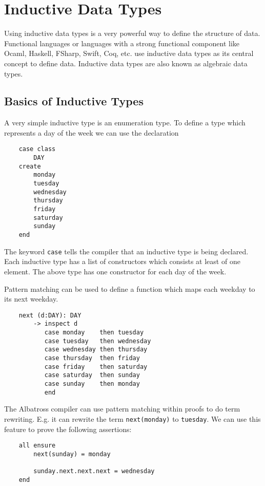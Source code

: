 \section{Inductive Data Types}

Using inductive data types is a very powerful way to define the structure of
data. Functional languages or languages with a strong functional component
like Ocaml, Haskell, FSharp, Swift, Coq, etc. use inductive data types as its
central concept to define data. Inductive data types are also known as
algebraic data types.


\subsection{Basics of Inductive Types}

A very simple inductive type is an enumeration type. To define a type which
represents a day of the week we can use the declaration

\begin{lstlisting}
    case class
        DAY
    create
        monday
        tuesday
        wednesday
        thursday
        friday
        saturday
        sunday
    end
\end{lstlisting}

The keyword \lstinline!case! tells the compiler that an inductive type is
being declared. Each inductive type has a list of constructors which consists
at least of one element. The above type has one constructor for each day of
the week.

Pattern matching can be used to define a function which maps each weekday to
its next weekday.

\begin{lstlisting}
    next (d:DAY): DAY
        -> inspect d
           case monday    then tuesday
           case tuesday   then wednesday
           case wednesday then thursday
           case thursday  then friday
           case friday    then saturday
           case saturday  then sunday
           case sunday    then monday
           end
\end{lstlisting}

The Albatross compiler can use pattern matching within proofs to do term
rewriting. E.g. it can rewrite the term \lstinline!next(monday)! to
\lstinline!tuesday!. We can use this feature to prove the following
assertions:

\begin{lstlisting}
    all ensure
        next(sunday) = monday

        sunday.next.next.next = wednesday
    end
\end{lstlisting}


